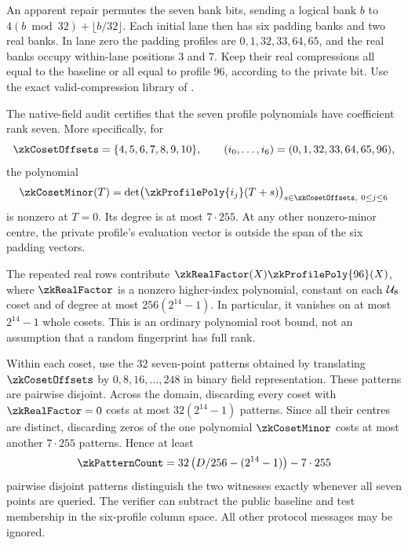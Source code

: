 An apparent repair permutes the seven bank bits, sending a logical bank $b$ to $4(b\bmod32)+\lfloor b/32\rfloor$. Each initial lane then has six padding banks and two real banks. In lane zero the padding profiles are $0,1,32,33,64,65$, and the real banks occupy within-lane positions $3$ and $7$. Keep their real compressions all equal to the baseline or all equal to profile $96$, according to the private bit. Use the exact valid-compression library of .

The native-field audit certifies that the seven profile polynomials have coefficient rank seven. More specifically, for
\[
 \zkCosetOffsets=\{4,5,6,7,8,9,10\},\qquad
 (i_0,\ldots,i_6)=(0,1,32,33,64,65,96),
\]
the polynomial
\[
 \zkCosetMinor(T)=\det\bigl(\zkProfilePoly{i_j}(T+s)\bigr)_{s\in\zkCosetOffsets,\ 0\le j\le6}
\]
is nonzero at $T=0$. Its degree is at most $7\cdot255$. At any other nonzero-minor centre, the private profile's evaluation vector is outside the span of the six padding vectors.

The repeated real rows contribute $\zkRealFactor(X)\zkProfilePoly{96}(X)$, where $\zkRealFactor$ is a nonzero higher-index polynomial, constant on each $\mathcal{U}_8$ coset and of degree at most $256(2^{14}-1)$. In particular, it vanishes on at most $2^{14}-1$ whole cosets. This is an ordinary polynomial root bound, not an assumption that a random fingerprint has full rank.

Within each coset, use the $32$ seven-point patterns obtained by translating $\zkCosetOffsets$ by $0,8,16,\ldots,248$ in binary field representation. These patterns are pairwise disjoint. Across the domain, discarding every coset with $\zkRealFactor=0$ costs at most $32(2^{14}-1)$ patterns. Since all their centres are distinct, discarding zeros of the one polynomial $\zkCosetMinor$ costs at most another $7\cdot255$ patterns. Hence at least
\[
 \zkPatternCount=32\left(D/256-(2^{14}-1)\right)-7\cdot255
\]
pairwise disjoint patterns distinguish the two witnesses exactly whenever all seven points are queried. The verifier can subtract the public baseline and test membership in the six-profile column space. All other protocol messages may be ignored.

